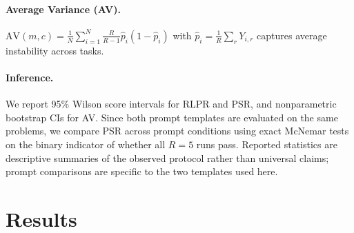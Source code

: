 \documentclass[11pt,a4paper]{article}
\begin{document}
\paragraph{Average Variance (AV).}
$\mathrm{AV}(m,c)=\frac{1}{N}\sum_{i=1}^{N} \frac{R}{R-1}\hat{p}_i(1-\hat{p}_i)$ with $\hat{p}_i=\frac{1}{R}\sum_r Y_{i,r}$ captures average instability across tasks.

\paragraph{Inference.}
We report 95\% Wilson score intervals for RLPR and PSR, and nonparametric bootstrap CIs for AV. Since both prompt templates are evaluated on the same problems, we compare PSR across prompt conditions using exact McNemar tests on the binary indicator of whether all $R=5$ runs pass. Reported statistics are descriptive summaries of the observed protocol rather than universal claims; prompt comparisons are specific to the two templates used here.

\section{Results}
\end{document}
